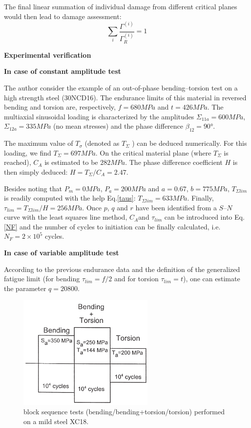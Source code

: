 \documentclass[3p,times,procedia,number]{elsarticle}
\begin{document}
\begin{flushleft}
	The final linear summation of individual damage from different
	critical planes would then lead to damage assessment:
	\begin{equation}
	\sum_{i}^{}\frac{\Gamma^{(i)}}{\Gamma_R^{(i)}}=1
	\label{damage}
	\end{equation}
	
\end{flushleft}

\textbf{Experimental verification}
\vspace{6pt}

\textbf{In case of constant amplitude test }

The author \cite{FFE:FFE452} consider the example of an out-of-phase bending–torsion test on a high strength steel (30NCD16). The endurance limits of this material in reversed
bending and torsion are, respectively, $f=680 MPa$ and $t=426 MPa$.  The multiaxial sinusoidal loading is characterized by the amplitudes $\Sigma_{11a} =600 MPa$, $\Sigma_{12a} =335 MPa$ (no mean stresses)
and the phase difference $\beta_{12} =90°$.

The maximum value of $T_\sigma$ (denoted as $T_\Sigma$ ) can be deduced numerically. For this loading, we find $T_\Sigma=697 MPa$. On the critical material
plane (where $T_\Sigma$ is reached), $C_A$ is estimated to be $282 MPa$. The phase difference coefficient $H$ is
then simply deduced: $H=T_\Sigma /C_A =2.47$.

Besides noting that $P_m =0 MPa$, $P_a=200 MPa$ and $a=0.67$, $b=775 MPa$, $T_{\Sigma lim}$ is readily
computed with the help Eq.\eqref{taus}: $T_{\Sigma lim} =633 MPa$. Finally, $\tau_{lim} =T_{\Sigma lim} /H=256 MPa$. Once $p$, $q$ and $r$ have been identified from a $S–N$ curve with the least squares line method, $C_A $and $\tau_{lim}$ can
be introduced into Eq. \eqref{NF} and the number of cycles to initiation can be finally calculated, i.e.
$N_F =2×10^5$ cycles.

\textbf{In case of variable amplitude test }

According to the previous endurance data and the
definition of the generalized fatigue limit (for bending
$\tau_{lim} =f/2$ and for torsion $\tau_{lim}=t$), one can estimate the parameter $q=20 800$.

\begin{figure}[h!]
	\centering
	\includegraphics[width=0.6\textwidth]{figures//block.png} 
	\caption{block sequence tests (bending/bending+torsion/torsion) performed on a mild
		steel XC18.}
	\label{block}
\end{figure} 
\end{document}
